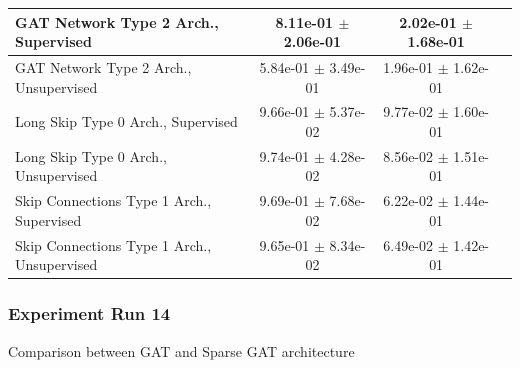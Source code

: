 \documentclass[a4paper]{article}
\begin{document}
\begin{table}[H]
\begin{tabular}{|l|c|c|c|}
GAT Network Type 2 Arch., Supervised   & 8.11e-01 $\pm$ 2.06e-01 & 2.02e-01 $\pm$ 1.68e-01 \\ \hline
GAT Network Type 2 Arch., Unsupervised   & 5.84e-01 $\pm$ 3.49e-01 & 1.96e-01 $\pm$ 1.62e-01 \\ \hline
Long Skip Type 0 Arch., Supervised   & 9.66e-01 $\pm$ 5.37e-02 & 9.77e-02 $\pm$ 1.60e-01 \\ \hline
Long Skip Type 0 Arch., Unsupervised   & 9.74e-01 $\pm$ 4.28e-02 & 8.56e-02 $\pm$ 1.51e-01 \\ \hline
Skip Connections Type 1 Arch., Supervised   & 9.69e-01 $\pm$ 7.68e-02 & 6.22e-02 $\pm$ 1.44e-01 \\ \hline
Skip Connections Type 1 Arch., Unsupervised   & 9.65e-01 $\pm$ 8.34e-02 & 6.49e-02 $\pm$ 1.42e-01 \\ \hline
      \end{tabular}
      \label{fig:13_tab2}
\end{table}




\subsubsection*{Experiment Run 14}
Comparison between GAT and Sparse GAT architecture
\end{document}

